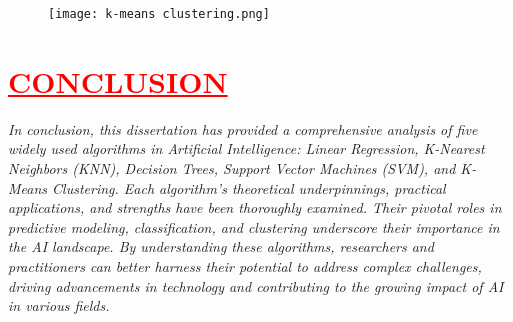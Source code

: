\documentclass[12pt]{article}
\begin{document}
\begin{figure}
    \centering
    \texttt{[image: k-means clustering.png]}
\end{figure}

\newpage
\section*{\textbf{\hspace{1cm}\textcolor{red}{\underline{\large{CONCLUSION}}}}}
\hspace{1cm}\large{\emph{In conclusion, this dissertation has provided a comprehensive analysis of five widely used algorithms in Artificial Intelligence: Linear Regression, K-Nearest Neighbors (KNN), Decision Trees, Support Vector Machines (SVM), and K-Means Clustering. Each algorithm's theoretical underpinnings, practical applications, and strengths have been thoroughly examined. Their pivotal roles in predictive modeling, classification, and clustering underscore their importance in the AI landscape. By understanding these algorithms, researchers and practitioners can better harness their potential to address complex challenges, driving advancements in technology and contributing to the growing impact of AI in various fields.}}
\end{document}
